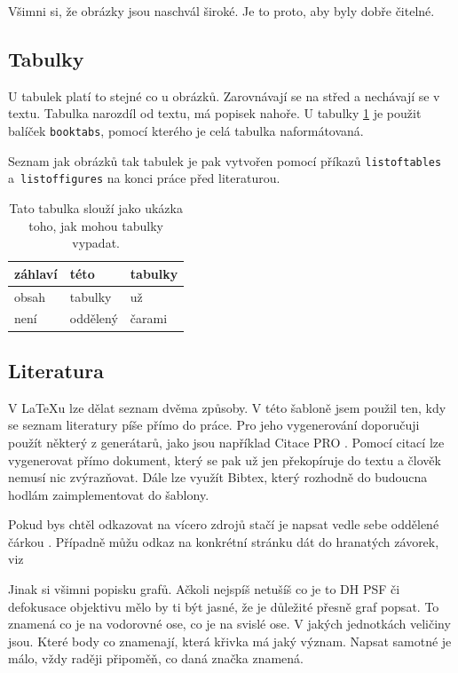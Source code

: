\documentclass[12pt, a4paper,
 twoside,        %
 openright
]{report}
\begin{document}
Všimni si, že obrázky jsou naschvál široké. Je to proto, aby byly dobře čitelné. 

\subsection{Tabulky}

U tabulek platí to stejné co u obrázků. Zarovnávají se na střed a nechávají se  v textu. Tabulka narozdíl od textu, má popisek nahoře. U tabulky \ref{tab:ukazka} je použit balíček \texttt{booktabs}, pomocí kterého je celá tabulka naformátovaná.

Seznam jak obrázků tak tabulek je pak vytvořen pomocí příkazů \texttt{listoftables} a~\texttt{listoffigures} na konci práce před literaturou.

\begin{table}
    \caption{Tato tabulka slouží jako ukázka toho, jak mohou tabulky vypadat.}
    \label{tab:ukazka}
    \centering
        \begin{tabular}{lll}
            \toprule %
            záhlaví& této & tabulky\\
            \midrule
            obsah&tabulky& už\\
            není & oddělený &čarami\\
            \bottomrule
        \end{tabular}
\end{table}

\subsection{Literatura}

V \LaTeX{}u lze dělat seznam dvěma způsoby. V této šabloně jsem použil ten, kdy se seznam literatury píše přímo do práce. Pro jeho vygenerování doporučuji použít některý z generátarů, jako jsou například Citace PRO \cite{citacePRO}. Pomocí citací lze vygenerovat přímo dokument, který se pak už jen překopíruje do textu a člověk nemusí nic zvýrazňovat. Dále lze využít Bibtex, který rozhodně do budoucna hodlám zaimplementovat do šablony.

Pokud bys chtěl odkazovat na vícero zdrojů stačí je napsat vedle sebe oddělené čárkou \cite{LaTeXprirucka, citacePRO, Born2019}. Případně můžu odkaz na konkrétní stránku dát do hranatých závorek, viz \cite[str.~1]{Born2019}

Jinak si všimni popisku grafů. Ačkoli nejspíš netušíš co je to DH PSF či defokusace objektivu mělo by ti být jasné, že je důležité přesně graf popsat. To znamená co je na vodorovné ose, co je na svislé ose. V jakých jednotkách veličiny jsou. Které body co znamenají, která křivka má jaký význam. Napsat samotné \uv{$\Delta \varphi$} je málo, vždy raději připoměň, co daná značka znamená.
\end{document}
